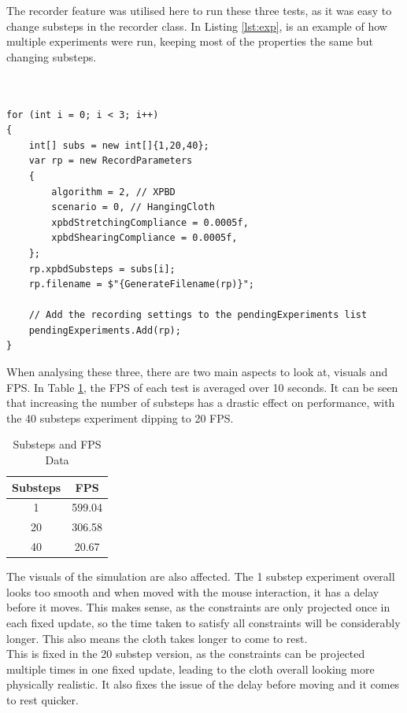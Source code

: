 \documentclass[12pt,a4paper]{article}
\begin{document}
The recorder feature was utilised here to run these three tests, as it was easy to change substeps in the recorder class. In Listing \ref{lst:exp}, is an example of how multiple experiments were run, keeping most of the properties the same but changing substeps. \\ \\ \\
\begin{lstlisting}[caption={Utilising the recorder feature},label={lst:exp}]
for (int i = 0; i < 3; i++)
{
	int[] subs = new int[]{1,20,40};
	var rp = new RecordParameters
	{
		algorithm = 2, // XPBD
		scenario = 0, // HangingCloth
		xpbdStretchingCompliance = 0.0005f, 
		xpbdShearingCompliance = 0.0005f, 
	};
	rp.xpbdSubsteps = subs[i];
	rp.filename = $"{GenerateFilename(rp)}";
	
	// Add the recording settings to the pendingExperiments list
	pendingExperiments.Add(rp);
}
\end{lstlisting}
When analysing these three, there are two main aspects to look at, visuals and FPS. In Table \ref{tab:sub}, the FPS of each test is averaged over 10 seconds. It can be seen that increasing the number of substeps has a drastic effect on performance, with the 40 substeps experiment dipping to 20 FPS.\\
\begin{table}[htbp]
	\centering
	\caption{Substeps and FPS Data}
	\label{tab:sub}
	\begin{tabular}{cc}
		\toprule
		Substeps & FPS \\
		\midrule
		1 & 599.04 \\
		20 & 306.58 \\
		40 & 20.67 \\
		\bottomrule
	\end{tabular}
\end{table}

The visuals of the simulation are also affected. The 1 substep experiment overall looks too smooth and when moved with the mouse interaction, it has a delay before it moves. This makes sense, as the constraints are only projected once in each fixed update, so the time taken to satisfy all constraints will be considerably longer. This also means the cloth takes longer to come to rest. \\

This is fixed in the 20 substep version, as the constraints can be projected multiple times in one fixed update, leading to the cloth overall looking more physically realistic. It also fixes the issue of the delay before moving and it comes to rest quicker. \\
\end{document}
